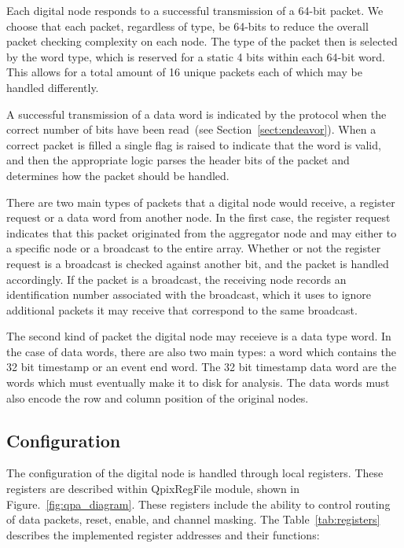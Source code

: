 Each digital node responds to a successful transmission of a 64-bit packet.
We choose that each packet, regardless of type, be 64-bits to reduce the overall packet checking complexity on each node.
The type of the packet then is selected by the word type, which is reserved for a static 4 bits within each 64-bit word.
This allows for a total amount of 16 unique packets each of which may be handled differently.

A successful transmission of a data word is indicated by the protocol when the correct number of bits have been read~(see Section~\ref{sect:endeavor}).
When a correct packet is filled a single flag is raised to indicate that the word is valid, and then the appropriate logic parses the header bits of the packet and determines how the packet should be handled.

There are two main types of packets that a digital node would receive, a register request or a data word from another node.
In the first case, the register request indicates that this packet originated from the aggregator node and may either to a specific node or a broadcast to the entire array.
Whether or not the register request is a broadcast is checked against another bit, and the packet is handled accordingly.
If the packet is a broadcast, the receiving node records an identification number associated with the broadcast, which it uses to ignore additional packets it may receive that correspond to the same broadcast.

The second kind of packet the digital node may receieve is a data type word.
In the case of data words, there are also two main types: a word which contains the 32 bit timestamp or an event end word.
The 32 bit timestamp data word are the words which must eventually make it to disk for analysis.
The data words must also encode the row and column position of the original nodes.

\subsection{Configuration}

The configuration of the digital node is handled through local registers.
These registers are described within QpixRegFile module, shown in Figure.~\ref{fig:qpa_diagram}.
These registers include the ability to control routing of data packets, reset, enable, and channel masking.
The Table~\ref{tab:registers} describes the implemented register addresses and their functions:

